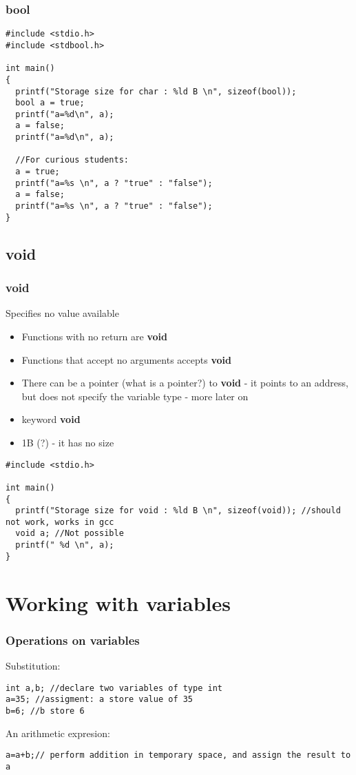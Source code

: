 \documentclass[10pt]{beamer}
\begin{document}
\begin{frame}[fragile]
  \frametitle{bool}
  \centering

    \begin{lstlisting}
#include <stdio.h>
#include <stdbool.h>

int main()
{
  printf("Storage size for char : %ld B \n", sizeof(bool));
  bool a = true;
  printf("a=%d\n", a);
  a = false;
  printf("a=%d\n", a);
  
  //For curious students:
  a = true;
  printf("a=%s \n", a ? "true" : "false");
  a = false;
  printf("a=%s \n", a ? "true" : "false");
}
 \end{lstlisting}
\end{frame}

\subsection{void}

\begin{frame}[fragile]
  \frametitle{void}
  \centering
  Specifies no value available
    \begin{itemize}
      \item Functions with no return are {\bf void}
      \item Functions that accept no arguments accepts {\bf void}
      \item There can be a pointer (what is a pointer?) to {\bf void} - it points to an address, but does not specify the variable type - more later on 
      \item keyword {\bf void}
      \item 1B (?) - it has no size
    \end{itemize}
  \centering

    \begin{lstlisting}
#include <stdio.h>

int main()
{
  printf("Storage size for void : %ld B \n", sizeof(void)); //should not work, works in gcc
  void a; //Not possible
  printf(" %d \n", a);
}
    \end{lstlisting}

\end{frame}

\section{Working with variables}

\begin{frame}[fragile]
  \frametitle{Operations on variables}
  \centering
Substitution:
    \begin{lstlisting}
int a,b; //declare two variables of type int
a=35; //assigment: a store value of 35
b=6; //b store 6
    \end{lstlisting}

An arithmetic expresion:
     \begin{lstlisting}   
a=a+b;// perform addition in temporary space, and assign the result to a
    \end{lstlisting}

\end{frame}
\end{document}
